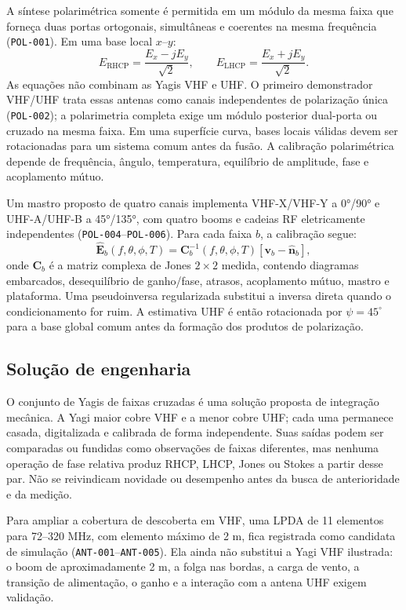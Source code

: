 A síntese polarimétrica somente é permitida em um módulo da mesma faixa que forneça duas portas ortogonais, simultâneas e coerentes na mesma frequência (\texttt{POL-001}). Em uma base local $x$--$y$:
\[
E_{\mathrm{RHCP}}=\frac{E_x-jE_y}{\sqrt{2}},\qquad E_{\mathrm{LHCP}}=\frac{E_x+jE_y}{\sqrt{2}}.
\]
As equações não combinam as Yagis VHF e UHF. O primeiro demonstrador VHF/UHF trata essas antenas como canais independentes de polarização única (\texttt{POL-002}); a polarimetria completa exige um módulo posterior dual-porta ou cruzado na mesma faixa. Em uma superfície curva, bases locais válidas devem ser rotacionadas para um sistema comum antes da fusão. A calibração polarimétrica depende de frequência, ângulo, temperatura, equilíbrio de amplitude, fase e acoplamento mútuo.

Um mastro proposto de quatro canais implementa VHF-X/VHF-Y a 0°/90° e UHF-A/UHF-B a 45°/135°, com quatro booms e cadeias RF eletricamente independentes (\texttt{POL-004}--\texttt{POL-006}). Para cada faixa $b$, a calibração segue:
\[
\widehat{\mathbf{E}}_b(f,\theta,\phi,T)=
\mathbf{C}_b^{-1}(f,\theta,\phi,T)
\left[\mathbf{v}_b-\widehat{\mathbf{n}}_b\right],
\]
onde $\mathbf{C}_b$ é a matriz complexa de Jones $2\times2$ medida, contendo diagramas embarcados, desequilíbrio de ganho/fase, atrasos, acoplamento mútuo, mastro e plataforma. Uma pseudoinversa regularizada substitui a inversa direta quando o condicionamento for ruim. A estimativa UHF é então rotacionada por $\psi=45^\circ$ para a base global comum antes da formação dos produtos de polarização.

\subsection*{Solução de engenharia}
O conjunto de Yagis de faixas cruzadas é uma solução proposta de integração mecânica. A Yagi maior cobre VHF e a menor cobre UHF; cada uma permanece casada, digitalizada e calibrada de forma independente. Suas saídas podem ser comparadas ou fundidas como observações de faixas diferentes, mas nenhuma operação de fase relativa produz RHCP, LHCP, Jones ou Stokes a partir desse par. Não se reivindicam novidade ou desempenho antes da busca de anterioridade e da medição.

Para ampliar a cobertura de descoberta em VHF, uma LPDA de 11 elementos para 72--320 MHz, com elemento máximo de 2 m, fica registrada como candidata de simulação (\texttt{ANT-001}--\texttt{ANT-005}). Ela ainda não substitui a Yagi VHF ilustrada: o boom de aproximadamente 2 m, a folga nas bordas, a carga de vento, a transição de alimentação, o ganho e a interação com a antena UHF exigem validação.
